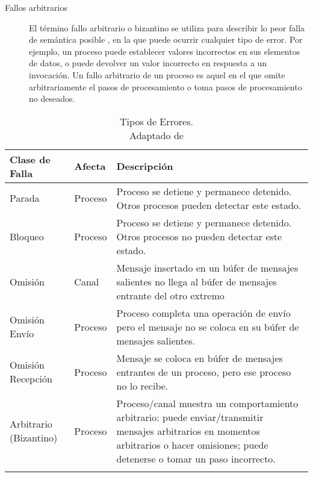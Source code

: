 \begin{description}
	\item [Fallos arbitrarios]  El término fallo arbitrario o bizantino se utiliza para describir lo peor  falla de  semántica posible , en la que puede ocurrir cualquier tipo de error. Por ejemplo, un proceso puede establecer valores incorrectos en sus elementos de datos, o puede devolver un valor incorrecto en respuesta a un 	invocación.
	Un fallo arbitrario de un proceso es aquel en el que omite arbitrariamente el 	pasos de procesamiento o toma pasos de procesamiento no deseados.  
\end{description}

\begin{table}[h]
	\footnotesize%
	\begin{center}
		\footnotesize
		 \begin{tabular}{p{}p{}p{}}
			\toprule
			Clase de Falla    &  Afecta   & Descripción  \\
			\midrule
			\quad Parada & Proceso & Proceso se detiene y permanece detenido.  Otros procesos pueden detectar este estado. \\
			
			\addlinespace
			\quad 	Bloqueo & Proceso & Proceso se detiene y permanece detenido.  Otros procesos no pueden  detectar este   estado.\\			\addlinespace
			
			\quad Omisión & Canal & Mensaje insertado en un búfer de mensajes  salientes no llega al  b\'ufer de mensajes   entrante del otro extremo  \\
			
			\addlinespace			
			\quad Omisión  Env\'io   & 	Proceso   & Proceso completa una operación de  envío pero el mensaje no se coloca     en su búfer de mensajes salientes.  \\
			
			\addlinespace		
			\quad Omisión  Recepci\'on & Proceso &  Mensaje se coloca en búfer  de mensajes   entrantes de un proceso, pero ese   proceso no lo recibe.  \\
			
			\addlinespace		
			\quad Arbitrario   (Bizantino) &  Proceso   & Proceso/canal muestra un comportamiento  arbitrario:  puede enviar/transmitir  mensajes arbitrarios en momentos arbitrarios o hacer omisiones; puede   detenerse  o tomar un  paso incorrecto. \\
			
			\addlinespace 
			\bottomrule
		\end{tabular}
	\end{center}
	\caption{Tipos de Errores. \\ Adaptado de \CO }
	\label{tab:cat-middle}
\end{table}


